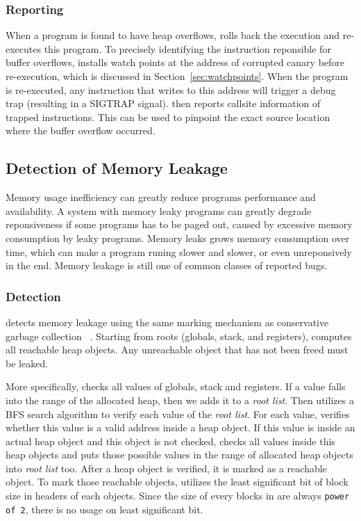 \subsubsection{Reporting}
\label{sec:overflowreport}
When a program is found to have heap overflows, \doubletake{} rolls back the execution 
and re-executes this program.
To precisely identifying the instruction reponsible for buffer overflows, 
\doubletake{} installs watch points at the address of corrupted canary before re-execution, 
which is discussed in Section~\ref{sec:watchpoints}.
When the program is re-executed, any instruction that writes to this address 
will trigger a debug trap (resulting in a SIGTRAP signal). 
\doubletake{} then reports callsite information of trapped instructions. 
This can be used to pinpoint the
exact source location where the buffer overflow occurred.
  
\subsection{Detection of Memory Leakage}
\label{sec:leak}
Memory usage inefficiency can greatly reduce programs performance and availability. 
A system with memory leaky programs can greatly degrade reponsiveness 
if some programs has to be paged out, caused by excessive memory consumption by leaky programs. 
Memory leaks grows memory consumption over time, which can make a program runing slower 
and slower, or even unreponsively in the end. 
Memory leakage is still one of common classes of reported bugs.

\subsubsection{Detection}
\doubletake{} detects memory leakage using the same marking mechanism as 
conservative garbage collection ~\cite{Wilson:1992:UGC:645648.664824}.
Starting from roots (globals, stack, and registers), \doubletake{}
computes all reachable heap objects. Any unreachable object that
has not been freed must be leaked.

More specifically, \doubletake{} checks all values of globals, stack and registers. 
If a value falls into the range of the allocated heap, 
then we adds it to a {\it root list}.
Then \doubletake{} utilizes a BFS search algorithm to verify each value of the {\it root list}. 
For each value, \doubletake{} verifies whether this value is a valid address inside a heap object.
If this value is inside an actual heap object and this object is not checked, 
\doubletake{} checks all values inside this heap objects and puts those possible values 
in the range of allocated heap objects into {\it root list} too. 
After a heap object is verified, it is marked as a reachable object. 
To mark those reachable objects, \doubletake{} utilizes the least significant bit
of block size in headers of each objects. 
Since the size of every blocks in \doubletake{} are always \texttt{power of 2},
there is no usage on least significant bit.

